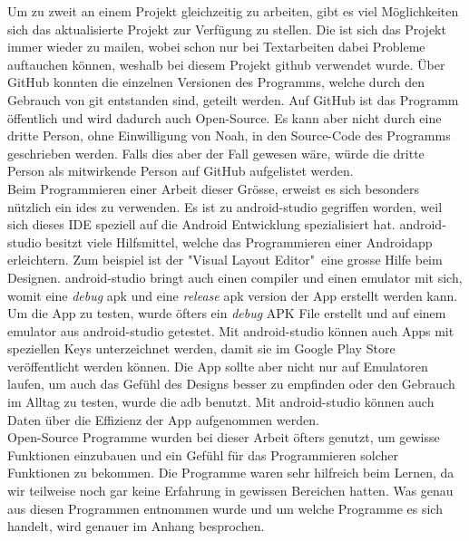 \documentclass[a4paper,11pt]{article}
\begin{document}
Um zu zweit an einem Projekt gleichzeitig zu arbeiten, gibt es viel Möglichkeiten sich das aktualisierte Projekt zur Verfügung zu stellen. Die  ist sich das 
Projekt immer wieder zu mailen, wobei schon nur bei Textarbeiten dabei Probleme auftauchen können, weshalb bei diesem Projekt \Gls{github} 
verwendet wurde. Über GitHub konnten die einzelnen Versionen des Programms, welche durch den Gebrauch von \gls{git} entstanden sind, geteilt werden. 
Auf GitHub ist das Programm öffentlich und wird dadurch auch Open-Source. Es kann aber nicht durch eine dritte Person, ohne Einwilligung von Noah, in den Source-Code
des Programms geschrieben werden. Falls dies aber der Fall gewesen wäre, würde die dritte Person als mitwirkende Person auf GitHub aufgelistet werden. \cite{github} \\

Beim Programmieren einer Arbeit dieser Grösse, erweist es sich besonders nützlich ein \glspl{ide} zu verwenden. Es ist zu \gls{android-studio} gegriffen worden, weil sich dieses 
IDE speziell auf die Android Entwicklung spezialisiert hat. \gls{android-studio} besitzt viele Hilfsmittel, welche das Programmieren einer Androidapp erleichtern. Zum beispiel ist der
"Visual Layout Editor"\ eine grosse Hilfe beim Designen. \gls{android-studio} bringt auch einen \gls{compiler} und einen \gls{emulator} mit sich, womit eine \textit{debug} \gls{apk} und eine
\textit{release} \gls{apk} version der App erstellt werden kann. Um die App zu testen, wurde öfters ein \textit{debug} APK File erstellt und auf einem \gls{emulator} aus \gls{android-studio}
getestet. Mit \gls{android-studio} können auch Apps mit speziellen Keys unterzeichnet werden, damit sie im Google Play Store veröffentlicht werden können.
Die App sollte aber nicht nur auf Emulatoren laufen, um auch das Gefühl des Designs besser zu empfinden oder den Gebrauch im Alltag zu testen, wurde die \gls{adb} benutzt.
Mit \gls{android-studio} können auch Daten über die Effizienz der App aufgenommen werden. 
\cite{android-studio} \\

Open-Source Programme wurden bei dieser Arbeit öfters genutzt, um gewisse Funktionen einzubauen und ein Gefühl für das Programmieren solcher Funktionen zu bekommen. Die Programme
waren sehr 
hilfreich beim Lernen, da wir teilweise noch gar keine Erfahrung in gewissen Bereichen hatten. Was genau aus diesen Programmen entnommen wurde und um welche Programme es sich handelt, wird 
genauer im Anhang besprochen. 
\end{document}
